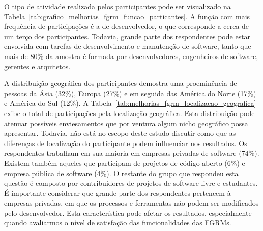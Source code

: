 O tipo de atividade realizada pelos participantes pode ser visualizado na
Tabela~\ref{tab:grafico_melhorias_fgrm_funcao_particantes}. A função com mais
frequência de participações é a de desenvolvedor, o que corresponde a cerca de
um terço dos participantes. Todavia, grande parte dos respondentes pode estar
envolvida com tarefas de desenvolvimento e manutenção de software, tanto que
mais de 80\% da amostra é formada por desenvolvedores, engenheiros de software,
gerentes e arquitetos.

\begin{table}[htpb]
\centering
{}
\caption{Função desempenhada pelos participantes}\label{tab:grafico_melhorias_fgrm_funcao_particantes}
\end{table}

A distribuição geográfica dos participantes demostra uma proeminência de
pessoas da Ásia (32\%), Europa (27\%) e em seguida das América do Norte (17\%)
e América do Sul (12\%). A
Tabela~\ref{tab:melhorias_fgrm_localizacao_geografica} exibe o total de
participações pela localização geográfica. Esta distribuição pode atenuar
possíveis enviesamentos que por ventura algum nicho geográfico possa
apresentar. Todavia, não está no escopo deste estudo discutir como que as
diferenças de localização do participante podem influenciar nos resultados. Os
respondentes trabalham em sua maioria em empresas privadas de software (74\%).
Existem também aqueles que participam de projetos de código aberto (6\%) e
empresa pública de software (4\%). O restante do grupo que respondeu esta
questão é composto por contribuidores de projetos de software livre e
estudantes. É importante considerar que grande parte dos respondentes pertencem
à empresas privadas, em que os processos e ferramentas não podem ser
modificados pelo desenvolvedor. Esta característica pode afetar os resultados,
especialmente quando avaliarmos o nível de satisfação das funcionalidades das
FGRMs.

